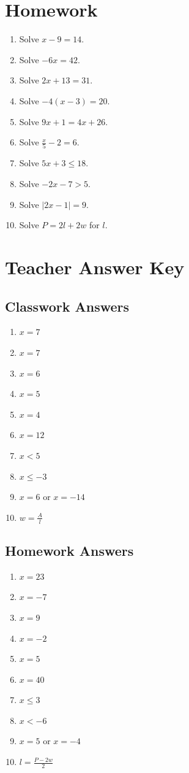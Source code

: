 \documentclass[11pt]{book}
\begin{document}
\section{Homework}

\begin{enumerate}
\item Solve \(x-9=14\).
\item Solve \(-6x=42\).
\item Solve \(2x+13=31\).
\item Solve \(-4(x-3)=20\).
\item Solve \(9x+1=4x+26\).
\item Solve \(\frac{x}{5}-2=6\).
\item Solve \(5x+3\le18\).
\item Solve \(-2x-7>5\).
\item Solve \(|2x-1|=9\).
\item Solve \(P=2l+2w\) for \(l\).
\end{enumerate}

\section{Teacher Answer Key}

\subsection{Classwork Answers}

\begin{enumerate}
\item \(x=7\)
\item \(x=7\)
\item \(x=6\)
\item \(x=5\)
\item \(x=4\)
\item \(x=12\)
\item \(x<5\)
\item \(x\le-3\)
\item \(x=6\) or \(x=-14\)
\item \(w=\frac{A}{l}\)
\end{enumerate}

\subsection{Homework Answers}

\begin{enumerate}
\item \(x=23\)
\item \(x=-7\)
\item \(x=9\)
\item \(x=-2\)
\item \(x=5\)
\item \(x=40\)
\item \(x\le3\)
\item \(x<-6\)
\item \(x=5\) or \(x=-4\)
\item \(l=\frac{P-2w}{2}\)
\end{enumerate}
\end{document}
